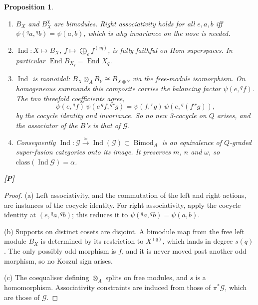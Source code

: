 \documentclass[11pt]{article}
\newtheorem{proposition}[theorem]{Proposition}
\theoremstyle{definition}
\newcommand{\cG}{\mathcal G}
\newcommand{\Bimod}{\operatorname{Bimod}}
\newcommand{\Ind}{\operatorname{Ind}}
\newcommand{\End}{\operatorname{End}}
\newcommand{\st}[1]{\textbf{[#1]}}
\begin{document}
\begin{proposition}\label{prop:Ind}
\begin{enumerate}[label=(\alph*),nosep]
\item $B_X$ and $B_X^\chi$ are bimodules. Right associativity holds for all $e,a,b$ iff
$\psi({}^qa,{}^qb)=\psi(a,b)$, which is why invariance on the nose is needed.
\item $\Ind:X\mapsto B_X$, $f\mapsto\bigoplus_ef^{(eq)}$, is fully faithful on Hom
superspaces. In particular $\End B_{X_q}=\End X_q$.
\item $\Ind$ is monoidal: $B_X\otimes_AB_Y\cong B_{X\otimes Y}$ via the free-module isomorphism.
On homogeneous summands this composite carries the balancing factor $\psi(e,{}^qf)$. The two
threefold coefficients agree,
\[\psi(e,{}^qf)\,\psi(e\,{}^qf,{}^{qr}g)=\psi(f,{}^rg)\,\psi(e,{}^q(f\,{}^rg)),\]
by the cocycle identity and invariance. So no new 3-cocycle on $Q$ arises, and the associator
of the $B$'s is that of $\cG$.
\item Consequently $\Ind:\cG\xrightarrow{\simeq}\Ind(\cG)\subset\Bimod_A$ is an equivalence of
$Q$-graded super-fusion categories onto its image. It preserves $m$, $n$ and $\omega$, so
$\mathrm{class}(\Ind\cG)=\alpha$.
\end{enumerate}
\st{P}
\end{proposition}
\begin{proof}
(a) Left associativity, and the commutation of the left and right actions, are instances of the
cocycle identity. For right associativity, apply the cocycle identity at
$(e,{}^qa,{}^qb)$; this reduces it to $\psi({}^qa,{}^qb)=\psi(a,b)$.

(b) Supports on distinct cosets are disjoint. A bimodule map from the free left module $B_X$ is
determined by its restriction to $X^{(q)}$, which lands in degree $s(q)$. The only possibly odd
morphism is $f$, and it is never moved past another odd morphism, so no Koszul sign arises.

(c) The coequaliser defining $\otimes_A$ splits on free modules, and $s$ is a homomorphism.
Associativity constraints are induced from those of $\pi^*\cG$, which are those of $\cG$.
\end{proof}
\end{document}
